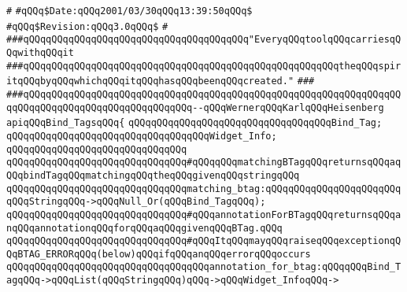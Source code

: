 \verb|#|\newline
\verb|#qQQq$Date:qQQq2001/03/30qQQq13:39:50qQQq$|\newline
\verb|#qQQq$Revision:qQQq3.0qQQq$|\newline
\verb|#|\newline
\newline
\newline
\newline
\verb|###qQQqqQQqqQQqqQQqqQQqqQQqqQQqqQQqqQQqqQQq"EveryqQQqtoolqQQqcarriesqQQqwithqQQqit|\newline
\verb|###qQQqqQQqqQQqqQQqqQQqqQQqqQQqqQQqqQQqqQQqqQQqqQQqqQQqqQQqtheqQQqspiritqQQqbyqQQqwhichqQQqitqQQqhasqQQqbeenqQQqcreated."|\newline
\verb|###|\newline
\verb|###qQQqqQQqqQQqqQQqqQQqqQQqqQQqqQQqqQQqqQQqqQQqqQQqqQQqqQQqqQQqqQQqqQQqqQQqqQQqqQQqqQQqqQQqqQQqqQQqqQQq--qQQqWernerqQQqKarlqQQqHeisenberg|\newline
\newline
\newline
\newline
\verb|apiqQQqBind_TagsqQQq{|\newline
\newline
\verb|qQQqqQQqqQQqqQQqqQQqqQQqqQQqqQQqqQQqBind_Tag;|\newline
\verb|qQQqqQQqqQQqqQQqqQQqqQQqqQQqqQQqqQQqWidget_Info;|\newline
\verb|qQQqqQQqqQQqqQQqqQQqqQQqqQQqqQQq|\newline
\verb|qQQqqQQqqQQqqQQqqQQqqQQqqQQqqQQq#qQQqqQQqmatchingBTagqQQqreturnsqQQqaqQQqbindTagqQQqmatchingqQQqtheqQQqgivenqQQqstringqQQq|\newline
\verb|qQQqqQQqqQQqqQQqqQQqqQQqqQQqqQQqmatching_btag:qQQqqQQqqQQqqQQqqQQqqQQqqQQqStringqQQq->qQQqNull_Or(qQQqBind_TagqQQq);|\newline
\newline
\newline
\verb|qQQqqQQqqQQqqQQqqQQqqQQqqQQqqQQq#qQQqannotationForBTagqQQqreturnsqQQqanqQQqannotationqQQqforqQQqaqQQqgivenqQQqBTag.qQQq|\newline
\verb|qQQqqQQqqQQqqQQqqQQqqQQqqQQqqQQq#qQQqItqQQqmayqQQqraiseqQQqexceptionqQQqBTAG_ERRORqQQq(below)qQQqifqQQqanqQQqerrorqQQqoccurs|\newline
\newline
\verb|qQQqqQQqqQQqqQQqqQQqqQQqqQQqqQQqqQQqannotation_for_btag:qQQqqQQqBind_TagqQQq->qQQqList(qQQqStringqQQq)qQQq->qQQqWidget_InfoqQQq->|\newline

